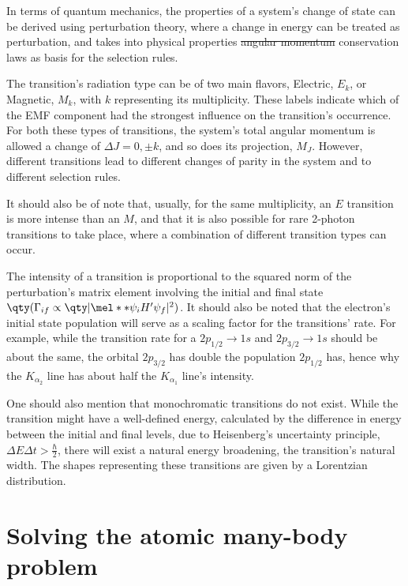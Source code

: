 In terms of quantum mechanics, the properties of a system's change of state can be derived using perturbation theory, where a change in energy can be treated as perturbation, and takes into physical properties \sout{angular momentum}  conservation laws as basis for the selection rules.

The transition's radiation type can be of two main flavors, Electric, $E_k$, or Magnetic, $M_k$, with $k$ representing its multiplicity. These labels indicate which of the \gls{EMF} component had the strongest influence on the transition's occurrence.
For both these types of transitions, the system's total angular momentum is allowed a change of $\Delta J = 0, \pm k$, and so does its projection, $M_J$. However, different transitions lead to different changes of parity in the system and to different selection rules.

It should also be of note that, usually, for the same multiplicity, an $E$ transition is more intense than an $M$, and that it is also possible for rare 2-photon transitions to take place, where a combination of different transition types can occur.



The intensity of a transition is proportional to the squared norm of the perturbation's matrix element involving the initial and final state $\qty(\Gamma_{if}\propto \qty|\mel**{\psi_i}{H'}{\psi_f}|^2)$. It should also be noted that the electron's initial state population will serve as a scaling factor for the transitions' rate.
For example, while the transition rate for a $2p_{1/2}\rightarrow1s$ and $2p_{3/2}\rightarrow1s$ should be about the same, the orbital $2p_{3/2}$ has double the population $2p_{1/2}$ has, hence why the $K_{\alpha_2}$ line has about half the $K_{\alpha_1}$ line's intensity.

One should also mention that monochromatic transitions do not exist. While the transition might have a well-defined energy, calculated by the difference in energy between the initial and final levels, due to Heisenberg's uncertainty principle, $\Delta E \Delta t > \frac{\hbar}{2}$, there will exist a natural energy broadening, the transition's natural width. The shapes representing these transitions are given by a Lorentzian distribution.




\section{Solving the atomic many-body problem}

